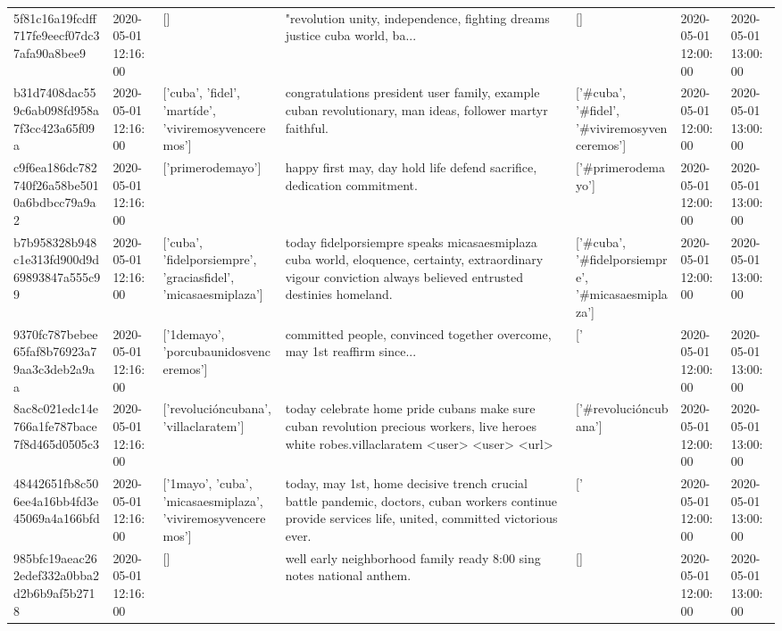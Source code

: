 \begin{tabular}{lllllll}
5f81c16a19fcdff717fe9eecf07dc37afa90a8bee9 & 2020-05-01 12:16:00 & [] & "revolution unity, independence, fighting dreams justice cuba world, ba... & [] & 2020-05-01 12:00:00 & 2020-05-01 13:00:00 \\
b31d7408dac559c6ab098fd958a7f3cc423a65f09a & 2020-05-01 12:16:00 & ['cuba', 'fidel', 'martíde', 'viviremosyvenceremos'] & congratulations president user family, example cuban revolutionary, man ideas, follower martyr faithful. & ['#cuba', '#fidel', '#viviremosyvenceremos'] & 2020-05-01 12:00:00 & 2020-05-01 13:00:00 \\
c9f6ea186dc782740f26a58be5010a6bdbcc79a9a2 & 2020-05-01 12:16:00 & ['primerodemayo'] & happy first may, day hold life defend sacrifice, dedication commitment. & ['#primerodemayo'] & 2020-05-01 12:00:00 & 2020-05-01 13:00:00 \\
b7b958328b948c1e313fd900d9d69893847a555c99 & 2020-05-01 12:16:00 & ['cuba', 'fidelporsiempre', 'graciasfidel', 'micasaesmiplaza'] & today fidelporsiempre speaks micasaesmiplaza cuba world, eloquence, certainty, extraordinary vigour conviction always believed entrusted destinies homeland. & ['#cuba', '#fidelporsiempre', '#micasaesmiplaza'] & 2020-05-01 12:00:00 & 2020-05-01 13:00:00 \\
9370fc787bebee65faf8b76923a79aa3c3deb2a9aa & 2020-05-01 12:16:00 & ['1demayo', 'porcubaunidosvenceremos'] & committed people, convinced together overcome, may 1st reaffirm since... & ['#1demayo', '#porcubaunidosvenceremos'] & 2020-05-01 12:00:00 & 2020-05-01 13:00:00 \\
8ac8c021edc14e766a1fe787bace7f8d465d0505c3 & 2020-05-01 12:16:00 & ['revolucióncubana', 'villaclaratem'] & today celebrate home pride cubans make sure cuban revolution precious workers, live heroes white robes.villaclaratem <user> <user> <url> & ['#revolucióncubana'] & 2020-05-01 12:00:00 & 2020-05-01 13:00:00 \\
48442651fb8c506ee4a16bb4fd3e45069a4a166bfd & 2020-05-01 12:16:00 & ['1mayo', 'cuba', 'micasaesmiplaza', 'viviremosyvenceremos'] & today, may 1st, home decisive trench crucial battle pandemic, doctors, cuban workers continue provide services life, united, committed victorious ever. & ['#1mayo', '#cuba', '#micasaesmiplaza', '#viviremosyvenceremos'] & 2020-05-01 12:00:00 & 2020-05-01 13:00:00 \\
985bfc19aeac262edef332a0bba2d2b6b9af5b2718 & 2020-05-01 12:16:00 & [] & well early neighborhood family ready 8:00 sing notes national anthem. & [] & 2020-05-01 12:00:00 & 2020-05-01 13:00:00 \\

\end{tabular}
